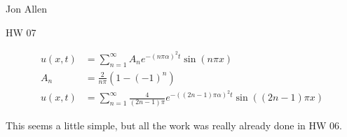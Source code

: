 \documentclass{article}
\begin{document}
Jon Allen

HW 07

\begin{align*}
  u(x,t)&=\sum\limits_{n=1}^\infty{A_ne^{-(n\pi\alpha)^2t}\sin(n\pi x)}\\
  A_n&=\frac{2}{n\pi}(1-(-1)^n)\\
  u(x,t)&=\sum\limits_{n=1}^\infty{\frac{4}{(2n-1)\pi}e^{-((2n-1)\pi\alpha)^2t}\sin((2n-1)\pi x)}
\end{align*}

This seems a little simple, but all the work was really already done in HW 06.
\end{document}
